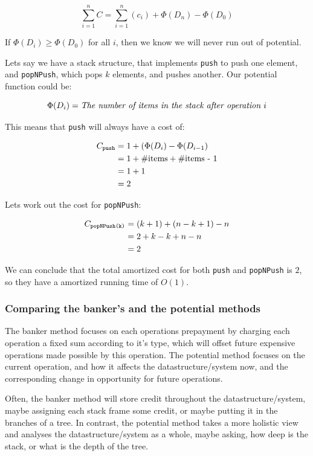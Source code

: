 \[
  \sum\limits_{i=1}^n C = \sum\limits_{i=1}^n \left( c_i \right) + \Phi(D_n) - \Phi(D_{0})
\]

If $\Phi(D_i) \geq \Phi(D_0)$ for all $i$, then we know we will never run out of
potential.

Lets say we have a stack structure, that implements \texttt{push} to push one
element, and \texttt{popNPush}, which pops $k$ elements, and pushes another. Our
potential function could be: 

\[
  \Phi(D_i) = \text{\textit{The number of items in the stack after operation $i$}}
\]

This means that \texttt{push} will always have a cost of:

\begin{align*}
  C_{\text{\texttt{push}}} &= 1 + \left(\Phi(D_i) - \Phi(D_{i-1}\right)\\
                           &= 1 + \text{\#items} + \text{\#items - 1}\\
                           &= 1 + 1\\
                           &= 2
\end{align*}

Lets work out the cost for \texttt{popNPush}:

\begin{align*}
  C_{\text{\texttt{popNPush(k)}}} &= (k + 1) + (n - k + 1) - n\\
                                  &= 2 + k - k + n - n\\
                                  &= 2
\end{align*}

We can conclude that the total amortized cost for both \texttt{push} and
\texttt{popNPush} is $2$, so they have a amortized running time of $O(1)$.

\subsubsection{Comparing the banker's and the potential methods}

The banker method focuses on each operations prepayment by charging each
operation a fixed sum according to it's type, which will offset future expensive
operations made possible by this operation. The potential method focuses on the
current operation, and how it affects the datastructure/system now, and the
corresponding change in opportunity for future operations.

Often, the banker method will store credit throughout the datastructure/system,
maybe assigning each stack frame some credit, or maybe putting it in the
branches of a tree. In contrast, the potential method takes a more holistic view
and analyses the datastructure/system as a whole, maybe asking, how deep is the
stack, or what is the depth of the tree.


